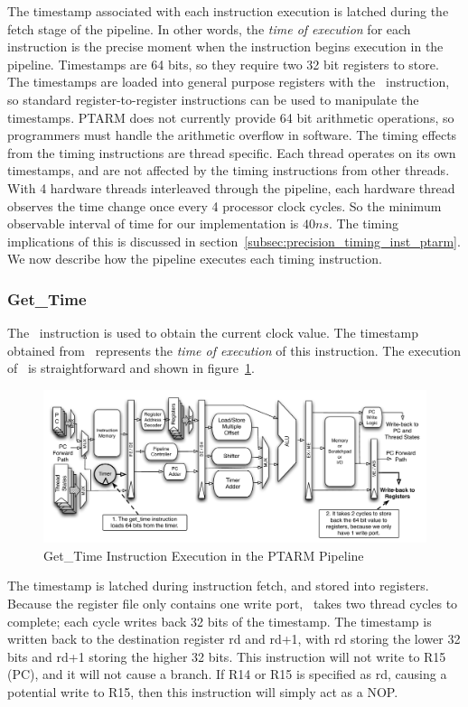 The timestamp associated with each instruction execution is latched during the fetch stage of the pipeline.
In other words, the \emph{time of execution} for each instruction is the precise moment when the instruction begins execution in the pipeline.
Timestamps are 64 bits, so they require two 32 bit registers to store.
The timestamps are loaded into general purpose registers with the \gettime\ instruction, so standard register-to-register instructions can be used to manipulate the timestamps. 
PTARM does not currently provide 64 bit arithmetic operations, so programmers must handle the arithmetic overflow in software.
The timing effects from the timing instructions are thread specific.   
Each thread operates on its own timestamps, and are not affected by the timing instructions from other threads.
With 4 hardware threads interleaved through the pipeline, each hardware thread observes the time change once every 4 processor clock cycles.
So the minimum observable interval of time for our implementation is $40 ns$. 
The timing implications of this is discussed in section~\ref{subsec:precision_timing_inst_ptarm}.
We now describe how the pipeline executes each timing instruction.  
	
\subsubsection{Get\_Time}    
The \gettime\ instruction is used to obtain the current clock value.
The timestamp obtained from \gettime\ represents the \emph{time of execution} of this instruction.
The execution of \gettime\ is straightforward and shown in figure~\ref{fig:get_time_pipeline_implementation}. 
\begin{figure}[h]
  
  \begin{center}
    \includegraphics[scale=.54]{figs/get_time_pipeline_implementation}
  \end{center}
  \vspace{-3mm}
  \caption{Get\_Time Instruction Execution in the PTARM Pipeline}
  \label{fig:get_time_pipeline_implementation}
\end{figure}
The timestamp is latched during instruction fetch, and stored into registers.
Because the register file only contains one write port, \gettime\ takes two thread cycles to complete; each cycle writes back 32 bits of the timestamp. 
The timestamp is written back to the destination register rd and rd+1, with rd storing the lower 32 bits and rd+1 storing the higher 32 bits. 
This instruction will not write to R15 (PC), and it will not cause a branch. 
If R14 or R15 is specified as rd, causing a potential write to R15, then this instruction will simply act as a NOP.

